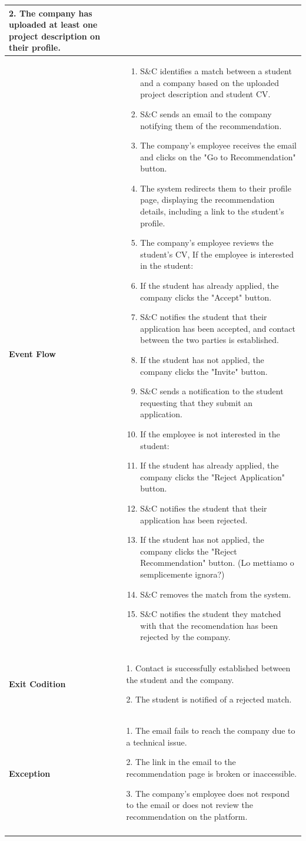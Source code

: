 \begin{longtable}{|p{}|p{}|}
2. The company has uploaded at least one project description on their profile.\\
\hline
\textbf{Event Flow} &  
\begin{enumerate}
\item S\&C identifies a match between a student and a company based on the uploaded project description and student CV.	
\item S\&C sends an email to the company notifying them of the recommendation.
\item  The company’s employee receives the email and clicks on the "Go to Recommendation" button.
\item  The system redirects them to their profile page, displaying the recommendation details, including a link to the student's profile.
\item The company’s employee reviews the student’s CV, If the employee is interested in the student:
\item  If the student has already applied, the company clicks the "Accept" button.
\item S\&C notifies the student that their application has been accepted, and contact between the two parties is established.
\item  If the student has not applied, the company clicks the "Invite" button.
\item S\&C sends a notification to the student requesting that they submit an application.
\item If the employee is not interested in the student:
\item If the student has already applied, the company clicks the "Reject Application" button.
\item S\&C notifies the student that their application has been rejected.
\item  If the student has not applied, the company clicks the "Reject Recommendation" button. (Lo mettiamo o semplicemente ignora?)
\item S\&C removes the match from the system.
\item S\&C notifies the student they matched with that the recomendation has been rejected by the company. 
\end{enumerate}\\
\hline
\textbf{Exit Codition} &  
1. Contact is successfully established between the student and the company.

2. The student is notified of a rejected match.\\
\hline
\textbf{Exception} &  
1. The email fails to reach the company due to a technical issue.

2. The link in the email to the recommendation page is broken or inaccessible.	

3. The company’s employee does not respond to the email or does not review the recommendation on the platform.	\\
\\
\hline
\end{longtable}



